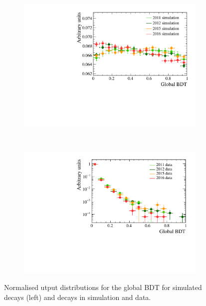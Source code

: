 \begin{figure}[tbp]
    \centering
    \begin{subfigure}[b]{0.48\textwidth}
        \includegraphics[width=\textwidth]{./Figs/Selection/BDTflat_signal.pdf}
    \end{subfigure}
    ~ %
    \begin{subfigure}[b]{0.48\textwidth}
       \includegraphics[width=\textwidth]{./Figs/Selection/BDTflat_bkgnd.pdf}
    \end{subfigure}
    \caption{Normalised utput distributions for the global BDT for \bsmumu simulated decays (left) and \bbbarmumux decays in simulation and data.}
    \label{fig:FlatteningBDT}
\end{figure}


